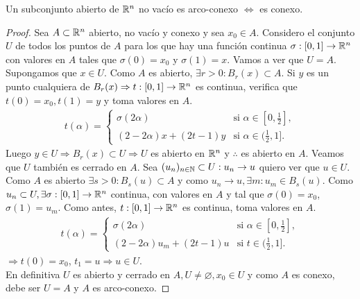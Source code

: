 \begin{theorem}
  Un subconjunto abierto de \(\mathbb{R}^n\) no vacío es arco-conexo \(\iff\) es conexo.

  \begin{proof}
    Sea \(A \subset \mathbb{R}^n\) abierto, no vacío y conexo y sea \(x_0 \in A\). Considero el conjunto \(U\) de todos los puntos de \(A\) para los que hay una función continua \(\sigma: [0, 1] \to \mathbb{R}^n\) con valores en \(A\) tales que \(\sigma(0) = x_0\) y \(\sigma(1) = x\). Vamos a ver que \(U = A\). \\
    Supongamos que \(x \in U\). Como \(A\) es abierto, \(\exists r > 0 : B_r(x) \subset A\). Si \(y\) es un punto cualquiera de \(B_r(x) \Rightarrow t: [0, 1] \to \mathbb{R}^n\) es continua, verifica que \(t(0) = x_0, t(1) = y\) y toma valores en \(A\).
    \begin{align*}
      t(\alpha) = \begin{cases}
                    \sigma(2\alpha)           & \text{si } \alpha \in [0, \frac{1}{2}], \\
                    (2 - 2 \alpha)x + (2t-1)y & \text{si } \alpha \in (\frac{1}{2}, 1].
                  \end{cases}
    \end{align*} Luego \(y \in U \Rightarrow B_r(x) \subset U \Rightarrow U\) es abierto en \(\mathbb{R}^n\) y \(\therefore\) es abierto en \(A\). Veamos que \(U\) también es cerrado en \(A\). Sea \((u_n)_{n \in \mathbb{N}} \subset U : u_n \to u\) quiero ver que \(u \in U\). Como \(A\) es abierto \(\exists s > 0 : B_s(u) \subset A\) y como \(u_n \to u, \exists m : u_m \in B_s(u)\). Como \(u_n \subset U, \exists \sigma: [0, 1] \to \mathbb{R}^n\) continua, con valores en \(A\) y tal que \(\sigma(0) = x_0\), \(\sigma(1) = u_m\). Como antes, \(t: [0, 1] \to \mathbb{R}^n\) es continua, toma valores en \(A\).
    \begin{align*} t(\alpha) = \begin{cases}
                    \sigma(2\alpha)                & \text{si } \alpha \in [0, \frac{1}{2}], \\
                    (2 - 2\alpha) u_m + (2t - 1) u & \text{si } t \in (\frac{1}{2}, 1].
                  \end{cases}
    \end{align*}\(\Rightarrow t(0) = x_0\), \(t_1 = u \Rightarrow u \in U\). \\
    En definitiva \(U\) es abierto y cerrado en \(A, U \neq \varnothing, x_0 \in U\) y como \(A\) es conexo, debe ser \(U = A\) y \(A\) es arco-conexo.
  \end{proof}
\end{theorem}

